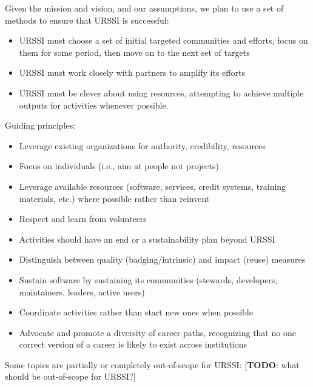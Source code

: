 \documentclass[
]{book}
\begin{document}
Given the mission and vision, and our assumptions, we plan to use a set of methods
to ensure that URSSI is successful:

\begin{itemize}
\item
  URSSI must choose a set of initial targeted communities and efforts, focus on
  them for some period, then move on to the next set of targets
\item
  URSSI must work closely with partners to amplify its efforts
\item
  URSSI must be clever about using resources, attempting to achieve multiple outputs
  for activities whenever possible.
\end{itemize}

Guiding principles:

\begin{itemize}
\item
  Leverage existing organizations for authority, credibility, resources
\item
  Focus on individuals (i.e., aim at people not projects)
\item
  Leverage available resources (software, services, credit systems, training
  materials, etc.) where possible rather than reinvent
\item
  Respect and learn from volunteers
\item
  Activities should have an end or a sustainability plan beyond URSSI
\item
  Distinguish between quality (badging/intrinsic) and impact (reuse) measures
\item
  Sustain software by sustaining its communities (stewards, developers, maintainers,
  leaders, active users)
\item
  Coordinate activities rather than start new ones when possible
\item
  Advocate and promote a diversity of career paths, recognizing that no one
  correct version of a career is likely to exist across institutions
\end{itemize}

Some topics are partially or completely out-of-scope for URSSI:
{[}\textbf{TODO}: what should be out-of-scope for URSSI?{]}
\end{document}
